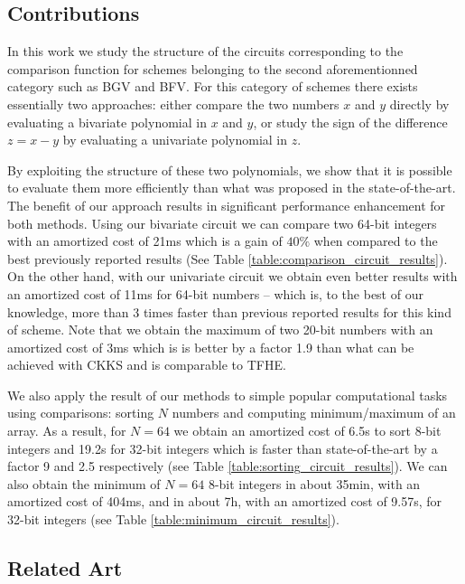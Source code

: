 \subsection{Contributions}
In this work we study the structure of the circuits corresponding to the comparison function for schemes belonging to the second aforementionned category such as BGV and BFV. For this category of schemes there exists essentially two approaches: either compare the two numbers $x$ and $y$ directly by evaluating a bivariate polynomial in $x$ and $y$, or study the sign of the difference $z=x-y$ by evaluating a univariate polynomial in $z$.

By exploiting the structure of these two polynomials, we show that it is possible to evaluate them more efficiently than what was proposed in the state-of-the-art. The benefit of our approach results in significant performance enhancement for both methods. Using our bivariate circuit we can compare two 64-bit integers with an amortized cost of 21ms which is a gain of $40\%$ when compared to the best previously reported results (See Table \ref{table:comparison_circuit_results}). On the other hand, with our univariate circuit we obtain even better results with an amortized cost of 11ms for 64-bit numbers -- which is, to the best of our knowledge, more than 3 times faster than previous reported results for this kind of scheme. 
Note that we obtain the maximum of two 20-bit numbers with an amortized cost of 3ms which is is better by a factor 1.9 than what can be achieved with CKKS and is comparable to TFHE.

We also apply the result of our methods to simple popular computational tasks using comparisons: sorting $N$ numbers and computing minimum/maximum of an array. As a result, for $N=64$ we obtain an amortized cost of 6.5s to sort 8-bit integers and 19.2s for 32-bit integers which is faster than state-of-the-art by a factor 9 and 2.5 respectively (see Table \ref{table:sorting_circuit_results}). We can also obtain the minimum of $N=64$ 8-bit integers in about 35min, with an amortized cost of 404ms, and in about 7h, with an amortized cost of 9.57s, for 32-bit integers (see Table \ref{table:minimum_circuit_results}).

\subsection{Related Art}
\label{sec:related-art}





